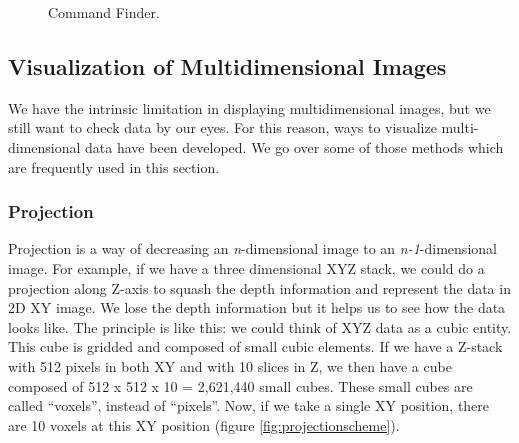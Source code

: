 \begin{figure}[htbp]
\centering
{}
\quad
{} 
\caption{Command Finder.}
\label{fig:commandfinder}
\end{figure}


\subsection{Visualization of Multidimensional Images}

We have the intrinsic limitation in displaying multidimensional images, but we still want to check data by our eyes. For this reason, ways to visualize multi-dimensional data have been developed. We go over some of those methods which are frequently used in this section. 

\subsubsection{Projection}

Projection is a way of decreasing an \textit{n}-dimensional image to an \textit{n-1}-dimensional image. For example, if we have a three dimensional XYZ stack, we could do a projection along Z-axis to squash the depth information and represent the data in 2D XY image. We lose the depth information but it helps us to see how the data looks like. The principle is like this: we could think of XYZ data as a cubic entity. This cube is gridded and composed of small cubic elements. If we have a Z-stack  with 512 pixels in both XY and with 10 slices in Z, we then have a 
cube composed of 512 x 512 x 10 =  2,621,440 small cubes. These small cubes are called ``voxels'', instead of ``pixels''. Now, if we take a single XY position, there are 10 voxels at this XY position (figure \ref{fig:projectionscheme}).
 
